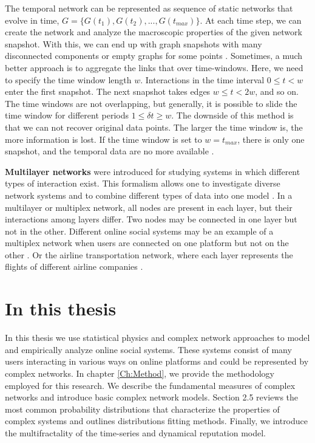 The temporal network can be represented as sequence of static networks that evolve in time, $G = \{ G(t_1), G(t_2), ..., G(t_{max})\}$. At each time step, we can create the network and analyze the macroscopic properties of the given network snapshot. With this, we can end up with graph snapshots with many disconnected components or empty graphs for some points \cite{holme2015modern}. Sometimes, a much better approach is to aggregate the links that over time-windows. Here, we need to specify the time window length $w$. Interactions in the time interval $0\leq t<w$ enter the first snapshot. The next snapshot takes edges $w \leq t <2w$, and so on. The time windows are not overlapping, but generally, it is possible to slide the time window for different periods $ 1 \leq \delta t \geq w$. The downside of this method is that we can not recover original data points. The larger the time window is, the more information is lost. If the time window is set to $w=t_{max}$, there is only one snapshot, and the temporal data are no more available \cite{krings2012effects, arnold2021moving}. 

\textbf{Multilayer networks} were introduced for studying systems in which different types of interaction exist. This formalism allows one to investigate diverse network systems and to combine different types of data into one model \cite{porter2018multilayer}. In a multilayer or multiplex network, all nodes are present in each layer, but their interactions among layers differ. Two nodes may be connected in one layer but not in the other. Different online social systems may be an example of a multiplex network when users are connected on one platform but not on the other \cite{aleta2019multilayer}. Or the airline transportation network, where each layer represents the flights of different airline companies \cite{kivelamultilayer}.   

\section{In this thesis}

In this thesis we use statistical physics and complex network approaches to model and empirically analyze online social systems. These systems consist of many users interacting in various ways on online platforms and could be represented by complex networks. In chapter \ref{Ch:Method}, we provide the methodology employed for this research. We describe the fundamental measures of complex networks and introduce basic complex network models. Section 2.5 reviews the most common probability distributions that characterize the properties of complex systems and outlines distributions fitting methods. Finally, we introduce the multifractality of the time-series and dynamical reputation model. 


